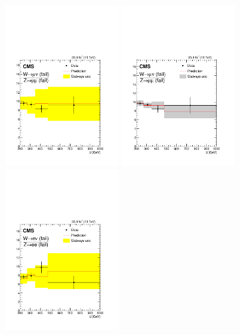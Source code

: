 \begin{figure}
\centering
\includegraphics[width=0.45\textwidth]{figures/pullsImpact/ratio_wmn_fail_zmm_fail_shapes_prefit.pdf}
\includegraphics[width=0.45\textwidth]{figures/pullsImpact/ratio_wmn_fail_zmm_fail_shapes_fit_b.pdf}\\
\includegraphics[width=0.45\textwidth]{figures/pullsImpact/ratio_wen_fail_zee_fail_shapes_prefit.pdf}

\end{figure}
